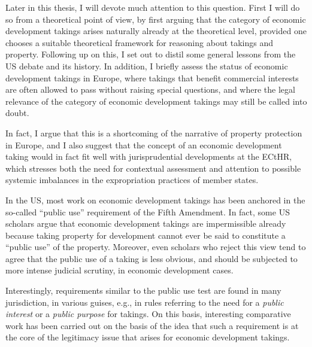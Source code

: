 \documentclass{article} %
\begin{document}
Later in this thesis, I will devote much attention to this question. First I will do so from a theoretical point of view, by first arguing that the category of economic development takings arises naturally already at the theoretical level, provided one chooses a suitable theoretical framework for reasoning about takings and property. Following up on this, I set out to distil some general lessons from the US debate and its history. In addition, I briefly assess the status of economic development takings in Europe, where takings that benefit commercial interests are often allowed to pass without raising special questions, and where the legal relevance of the category of economic development takings may still be called into doubt.

In fact, I argue that this is a shortcoming of the narrative of property protection in Europe, and I also suggest that the concept of an economic development taking would in fact fit well with jurisprudential developments at the ECtHR, which stresses both the need for contextual assessment and attention to possible systemic imbalances in the expropriation practices of member states.


In the US, most work on economic development takings has been anchored in the so-called ``public use'' requirement of the Fifth Amendment. In fact, some US scholars argue that economic development takings are impermissible already because taking property for development cannot ever be said to constitute a ``public use'' of the property. Moreover, even scholars who reject this view tend to agree that the public use of a taking is less obvious, and should be subjected to more intense judicial scrutiny, in economic development cases.

Interestingly, requirements similar to the public use test are found in many jurisdiction, in various guises, e.g., in rules referring to the need for a {\it public interest} or a {\it public purpose} for takings. On this basis, interesting comparative work has been carried out on the basis of the idea that such a requirement is at the core of the legitimacy issue that arises for economic development takings.
\end{document}

